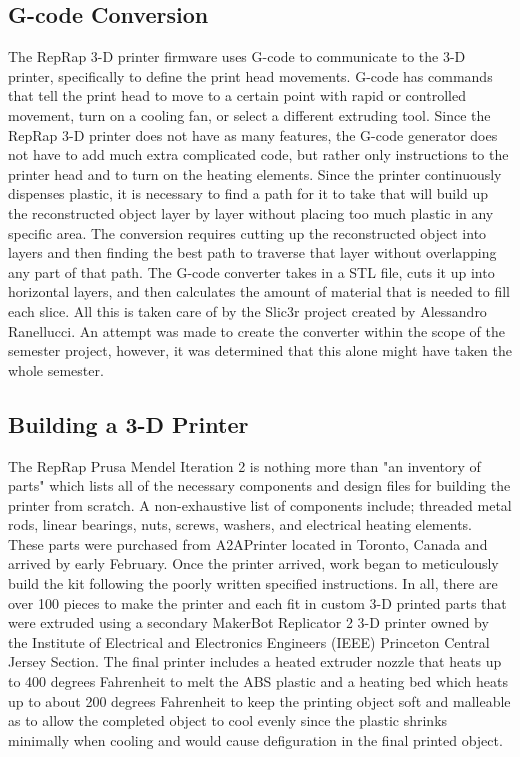 \documentclass[pdftex,10.5pt]{report}
\begin{document}
\subsection{G-code Conversion}
The RepRap 3-D printer firmware uses G-code to communicate to the 3-D printer, specifically to define the print head movements. G-code has commands that tell the print head to move to a certain point with rapid or controlled movement, turn on a cooling fan, or select a different extruding tool. Since the RepRap 3-D printer does not have as many features, the G-code generator does not have to add much extra complicated code, but rather only instructions to the printer head and to turn on the heating elements. Since the printer continuously dispenses plastic, it is necessary to find a path for it to take that will build up the reconstructed object layer by layer without placing too much plastic in any specific area. The conversion requires cutting up the reconstructed object into layers and then finding the best path to traverse that layer without overlapping any part of that path. The G-code converter takes in a STL file, cuts it up into horizontal layers, and then calculates the amount of material that is needed to fill each slice. All this is taken care of by the Slic3r project created by Alessandro Ranellucci. \cite{slic3r} An attempt was made to create the converter within the scope of the semester project, however, it was determined that this alone might have taken the whole semester. 

\subsection{Building a 3-D Printer}
The RepRap Prusa Mendel Iteration 2 is nothing more than "an inventory of parts" which lists all of the necessary components and design files for building the printer from scratch. A non-exhaustive list of components include; threaded metal rods, linear bearings, nuts, screws, washers, and electrical heating elements. \cite{reprap} These parts were purchased from A2APrinter located in Toronto, Canada and arrived by early February. Once the printer arrived, work began to meticulously build the kit following the poorly written specified instructions. In all, there are over 100 pieces to make the printer and each fit in custom 3-D printed parts that were extruded using a secondary MakerBot Replicator 2 3-D printer owned by the  Institute of Electrical and Electronics Engineers (IEEE) Princeton Central Jersey Section. The final printer includes a heated extruder nozzle that heats up to 400 degrees Fahrenheit to melt the ABS plastic and a heating bed which heats up to about 200 degrees Fahrenheit to keep the printing object soft and malleable as to allow the completed object to cool evenly since the plastic shrinks minimally when cooling and would cause defiguration in the final printed object.
\end{document}
